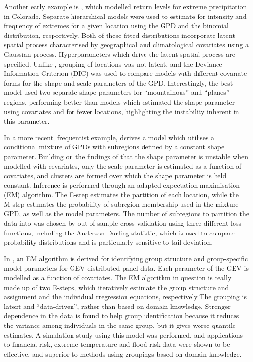 \documentclass{article}
\numberwithin{equation}{section}
\begin{document}
Another early example is \citet{Cooley2007}, which modelled return levels for extreme precipitation in Colorado.
Separate hierarchical models were used to estimate for intensity and frequency of extremes for a given location using the GPD and the binomial distribution, respectively.
Both of these fitted distributions incorporate latent spatial process characterised by geographical and climatological covariates using a Gaussian process. 
Hyperparameters which drive the latent spatial process are specified.
Unlike \cite{Bottolo2003}, grouping of locations was not latent, and the Deviance Information Criterion (DIC) was used to compare models with different covariate forms for the shape and scale parameters of the GPD.
Interestingly, the best model used two separate shape parameters for ``mountainous'' and ``planes'' regions, performing better than models which estimated the shape parameter using covariates and for fewer locations, highlighting the instability inherent in this parameter.

In a more recent, frequentist example, \citet{Carreau2017} derives a model which utilises a conditional mixture of GPDs with subregions defined by a constant shape parameter.
Building on the findings of \cite{Cooley2007} that the shape parameter is unstable when modelled with covariates, only the scale parameter is estimated as a function of covariates, and clusters are formed over which the shape parameter is held constant. 
Inference is performed through an adapted expectation-maximisation (EM) algorithm. 
The E-step estimates the partition of each location, while the M-step estimates the probability of subregion membership used in the mixture GPD, as well as the model parameters.
The number of subregions to partition the data into was chosen by out-of-sample cross-validation using three different loss functions, including the Anderson-Darling statistic, which is used to compare probability distributions and is particularly sensitive to tail deviation.

In \cite{Dupuis2023}, an EM algorithm is derived for identifying group structure and group-specific model parameters for GEV distributed panel data.
Each parameter of the GEV is modelled as a function of covariates. 
The EM algorithm in question is really made up of two E-steps, which iteratively estimate the group structure and assignment and the individual rregression equations, respectively
The grouping is latent and ``data-driven'', rather than based on domain knowledge. 
Stronger dependence in the data is found to help group identification because it reduces the variance among individuals in the same group, but it gives worse quantile estimates. 
A simulation study using this model was performed, and applications to financial risk, extreme temperature and flood risk data were shown to be effective, and superior to methods using groupings based on domain knowledge.
\end{document}
